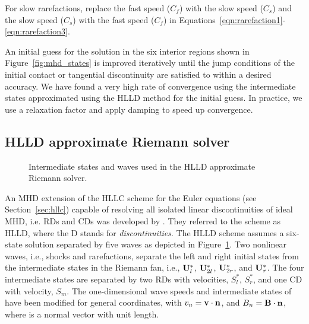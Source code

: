 For slow rarefactions, replace the fast speed ($C_f$) with the slow speed ($C_s$) and the slow speed ($C_s$) with the fast speed ($C_f$) in Equations~\eqref{eqn:rarefaction1}-\eqref{eqn:rarefaction3}.  

An initial guess for the solution in the six interior regions shown in Figure~\ref{fig:mhd_states} is improved iteratively until the jump conditions of the initial contact or tangential discontinuity are satisfied to within a desired accuracy.  We have found a very high rate of convergence using the intermediate states approximated using the HLLD method for the initial guess. In practice, we use a relaxation factor and apply damping to speed up convergence. 

\subsection[HLLD approximate Riemann solver]{HLLD approximate Riemann solver}
\label{sec:hlld}

\begin{figure}[htbp]\figSpace
\begin{center}

\end{center}
\caption{Intermediate states and waves used in the HLLD approximate Riemann solver.}
\label{fig:hlld_rstates}
\figSpace
\end{figure}

An MHD extension of the HLLC scheme for the Euler equations (see Section~\ref{sec:hllc}) capable of resolving all isolated linear discontinuities of ideal MHD, i.e. RDs and CDs was developed by \citet{Miyoshi:2005}.  They referred to the scheme as HLLD, where the D stands for \emph{discontinuities}.  The HLLD scheme assumes a six-state solution separated by five waves as depicted in Figure~\ref{fig:hlld_rstates}.  Two nonlinear waves, i.e., shocks and rarefactions, separate the left and right initial states from the intermediate states in the Riemann fan, i.e., $\mathbf{U}_{l}^*$, $\mathbf{U}_{2l}^*$, $\mathbf{U}_{2r}^*$, and $\mathbf{U}_{r}^*$.  The four intermediate states are separated by two RDs with velocities, $S^*_l$, $S^*_r$, and one CD with velocity, $S_m$.  The one-dimensional wave speeds and intermediate states of \citep{Miyoshi:2005} have been modified for general coordinates, with $v_n = \mathbf{v}\cdot\mathbf{n}$, and $B_n = \mathbf{B}\cdot\mathbf{n}$, where   is a normal vector with unit length.  


